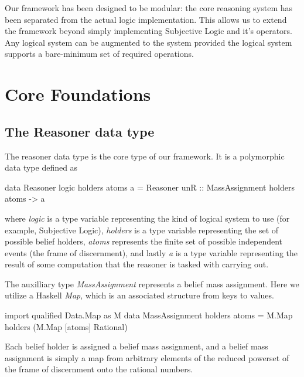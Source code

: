 \documentclass[a4paper]{report}
\begin{document}
\par
Our framework has been designed to be modular: the core reasoning system has been
separated from the actual logic implementation. This allows us to extend the framework
beyond simply implementing Subjective Logic and it's operators. Any logical system
can be augmented to the system provided the logical system supports a bare-minimum
set of required operations.



\section{Core Foundations}

\subsection{The Reasoner data type}

\par
The reasoner data type is the core type of our framework. It is a polymorphic data
type defined as

\begin{code}
  data Reasoner logic holders atoms a = Reasoner {
    unR :: MassAssignment holders atoms -> a 
  }
\end{code}

where \emph{logic} is a type variable representing the kind of logical system to
use (for example, Subjective Logic), \emph{holders} is a type variable representing
the set of possible belief holders, \emph{atoms} represents the finite set of possible
independent events (the frame of discernment), and lastly \emph{a} is a type variable
representing the result of some computation that the reasoner is tasked with carrying
out.

\par
The auxilliary type \emph{MassAssignment} represents a belief mass assignment. Here
we utilize a Haskell \emph{Map}, which is an associated structure from keys to values.

\begin{code}
import qualified Data.Map as M
data MassAssignment holders atoms = M.Map holders (M.Map [atoms] Rational)
\end{code}

Each belief holder is assigned a belief mass assignment, and a belief mass assignment
is simply a map from arbitrary elements of the reduced powerset of the frame of discernment
onto the rational numbers.
\end{document}
